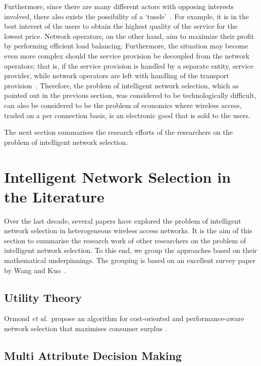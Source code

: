Furthermore, since there are many different actors with opposing interests involved, there also exists the possibility of a `tussle'~\cite{Clark02}. For example, it is in the best interest of the users to obtain the highest quality of the service for the lowest price. Network operators, on the other hand, aim to maximize their profit by performing efficient load balancing. Furthermore, the situation may become even more complex should the service provision be decoupled from the network operators; that is, if the service provision is handled by a separate entity, service provider, while network operators are left with handling of the transport provision~\cite{DMBushTussle09}. Therefore, the problem of intelligent network selection, which as pointed out in the previous section, was considered to be technologically difficult, can also be considered to be the problem of economics where wireless access, traded on a per connection basis, is an electronic good that is sold to the users.

The next section summarises the research efforts of the researchers on the problem of intelligent network selection.

\section{Intelligent Network Selection in the Literature} %
\label{sec:intelligent_network_selection_in_the_literature_intelligent}
Over the last decade, several papers have explored the problem of intelligent network selection in heterogeneous wireless access networks. It is the aim of this section to summarise the research work of other researchers on the problem of intelligent network selection. To this end, we group the approaches based on their mathematical underpinnings. The grouping is based on an excellent survey paper by Wang and Kuo~\cite{LushengKuo2013}.

\subsection{Utility Theory} %
\label{sub:utility_theory_intelligent}
Ormond \emph{et al.}~propose an algorithm for cost-oriented and performance-aware network selection that maximises consumer surplus \cite{OrmondCS106, OrmondCS206}.

\subsection{Multi Attribute Decision Making} %
\label{sub:multi_attribute_decision_making_intelligent}

